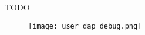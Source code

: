 TODO

\begin{figure}[h]
    \centering
    \texttt{[image: user\_dap\_debug.png]}
    \label{fig:userDAP}
\end{figure}


